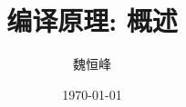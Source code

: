 \documentclass[]{beamer}
\title[]{编译原理: 概述}
\author[魏恒峰]{\large 魏恒峰}
\institute{hfwei@nju.edu.cn}
\date{\today}
\begin{document}
\maketitle



\thankyou{}

\end{document}
